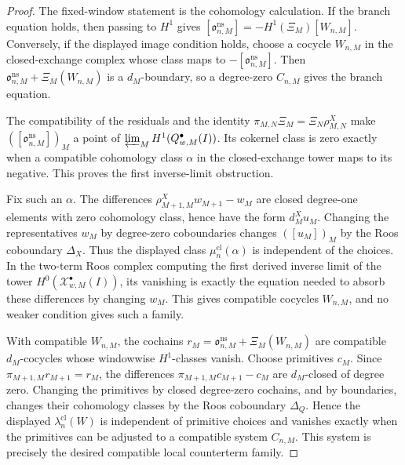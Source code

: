 \begin{proof}
  The fixed-window statement is the cohomology calculation.  If the
  branch equation holds, then passing to \(H^1\) gives
  \([\mathfrak o^{\mathrm{ns}}_{n,M}]
  =-H^1(\Xi_M)[W_{n,M}]\).  Conversely, if the displayed image condition
  holds, choose a cocycle \(W_{n,M}\) in the closed-exchange complex whose
  class maps to \(-[\mathfrak o^{\mathrm{ns}}_{n,M}]\).  Then
  \(\mathfrak o^{\mathrm{ns}}_{n,M}+\Xi_M(W_{n,M})\) is a
  \(d_M\)-boundary, so a degree-zero \(C_{n,M}\) gives the branch
  equation.

  The compatibility of the residuals and the identity
  \(\pi_{M,N}\Xi_M=\Xi_N\rho^X_{M,N}\) make
  \(([\mathfrak o^{\mathrm{ns}}_{n,M}])_M\) a point of
  \(\varprojlim_M H^1(\mathcal Q^\bullet_{w,M}(I))\).  Its cokernel class
  is zero exactly when a compatible cohomology class \(\alpha\) in the
  closed-exchange tower maps to its negative.  This proves the first
  inverse-limit obstruction.

  Fix such an \(\alpha\).  The differences
  \(\rho^X_{M+1,M}w_{M+1}-w_M\) are closed degree-one elements with zero
  cohomology class, hence have the form \(d^X_M u_M\).  Changing the
  representatives \(w_M\) by degree-zero coboundaries changes
  \(([u_M])_M\) by the Roos coboundary \(\Delta_X\).  Thus the displayed
  class \(\mu^{\mathrm{cl}}_n(\alpha)\) is independent of the choices.  In
  the two-term Roos complex computing the first derived inverse limit of
  the tower \(H^0(\mathcal X^\bullet_{w,M}(I))\), its vanishing is exactly
  the equation needed to absorb these differences by changing
  \(w_M\).  This gives compatible cocycles \(W_{n,M}\), and no weaker
  condition gives such a family.

  With compatible \(W_{n,M}\), the cochains
  \(r_M=\mathfrak o^{\mathrm{ns}}_{n,M}+\Xi_M(W_{n,M})\) are compatible
  \(d_M\)-cocycles whose windowwise \(H^1\)-classes vanish.  Choose
  primitives \(c_M\).  Since \(\pi_{M+1,M}r_{M+1}=r_M\), the differences
  \(\pi_{M+1,M}c_{M+1}-c_M\) are \(d_M\)-closed of degree zero.  Changing
  the primitives by closed degree-zero cochains, and by boundaries, changes
  their cohomology classes by the Roos coboundary \(\Delta_Q\).  Hence the
  displayed \(\lambda^{\mathrm{cl}}_n(W)\) is independent of primitive
  choices and vanishes exactly when the primitives can be adjusted to a
  compatible system \(C_{n,M}\).  This system is precisely the desired
  compatible local counterterm family.


\end{proof}
